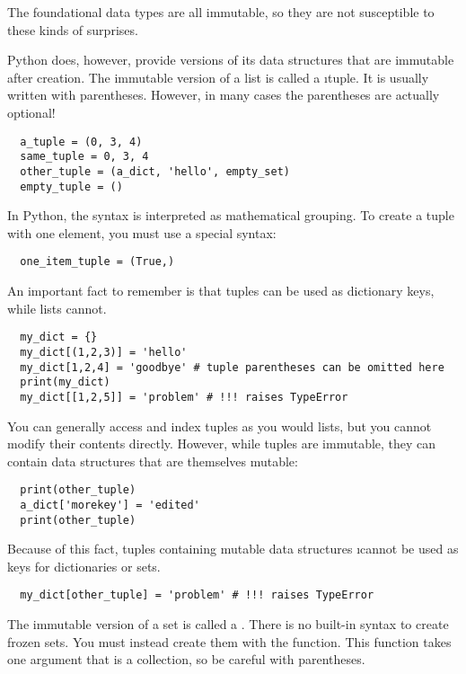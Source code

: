 \documentclass[letterpaper, 12pt, titlepage, twoside]{article}
\begin{document}
The foundational data types are all immutable, so they are not susceptible to
these kinds of surprises.

Python does, however, provide versions of its data structures that are
immutable after creation. The immutable version of a list is called a
\i{tuple}. It is usually written with parentheses. However, in many cases the
parentheses are actually optional!

\begin{lstlisting}
  a_tuple = (0, 3, 4)
  same_tuple = 0, 3, 4
  other_tuple = (a_dict, 'hello', empty_set)
  empty_tuple = ()
\end{lstlisting}

In Python, the syntax  is interpreted as mathematical grouping. To
create a tuple with one element, you must use a special syntax:

\begin{lstlisting}
  one_item_tuple = (True,)
\end{lstlisting}

An important fact to remember is that tuples can be used as dictionary keys,
while lists cannot.

\begin{lstlisting}
  my_dict = {}
  my_dict[(1,2,3)] = 'hello'
  my_dict[1,2,4] = 'goodbye' # tuple parentheses can be omitted here
  print(my_dict)
  my_dict[[1,2,5]] = 'problem' # !!! raises TypeError
\end{lstlisting}

You can generally access and index tuples as you would lists, but you cannot
modify their contents directly. However, while tuples are immutable, they can
contain data structures that are themselves mutable:

\begin{lstlisting}
  print(other_tuple)
  a_dict['morekey'] = 'edited'
  print(other_tuple)
\end{lstlisting}

Because of this fact, tuples containing mutable data structures
\i{cannot} be used as keys for dictionaries or sets.

\begin{lstlisting}
  my_dict[other_tuple] = 'problem' # !!! raises TypeError
\end{lstlisting}

The immutable version of a set is called a . There is no
built-in syntax to create frozen sets. You must instead create them with the
 function. This function takes one argument that is a
collection, so be careful with parentheses.
\end{document}
